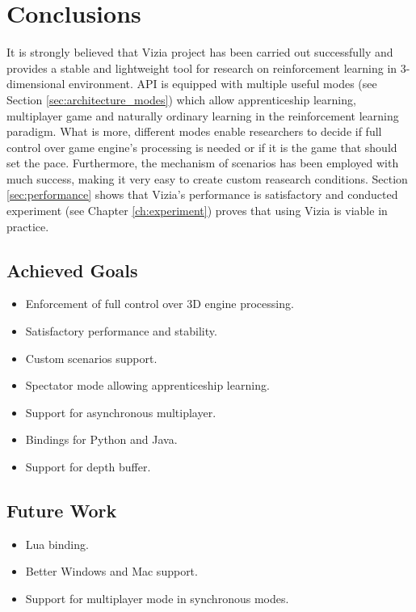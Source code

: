 \chapter{Conclusions}\label{ch:conclusions}
	It is strongly believed that Vizia project has been carried out successfully and provides a stable and lightweight tool for research on reinforcement learning in 3-dimensional environment. API is equipped with multiple useful modes (see Section \ref{sec:architecture_modes}) which allow apprenticeship learning, multiplayer game and naturally ordinary learning in the reinforcement learning paradigm. What is more, different modes enable researchers to decide if full control over game engine's processing is needed or if it is the game that should set the pace. Furthermore, the mechanism of scenarios has been employed with much success, making it very easy to create custom reasearch conditions. Section \ref{sec:performance} shows that Vizia's performance is satisfactory and conducted experiment (see Chapter \ref{ch:experiment}) proves that using Vizia is viable in practice. 

\section{Achieved Goals}
	\begin{itemize}
		\item Enforcement of full control over 3D engine processing.
		\item Satisfactory performance and stability.
		\item Custom scenarios support.
		\item Spectator mode allowing apprenticeship learning.
		\item Support for asynchronous multiplayer.
		\item Bindings for Python and Java.
		\item Support for depth buffer.
	\end{itemize}

\section{Future Work}
	\begin{itemize}
		\item Lua binding.
		\item Better Windows and Mac support.
		\item Support for multiplayer mode in synchronous modes.
	\end{itemize}
